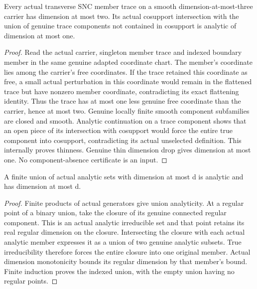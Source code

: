 \begin{lemma}
\label{hir:dimension-three-boundary-unselected-trace-dimone}
\leanok
Every actual transverse SNC member trace on a smooth dimension-at-most-three
carrier has dimension at most two. Its actual cosupport intersection with the
union of genuine trace components not contained in cosupport is analytic of
dimension at most one.
\end{lemma}
\begin{proof}
Read the actual carrier, singleton member trace and indexed boundary member in
the same genuine adapted coordinate chart. The member's coordinate lies among
the carrier's free coordinates. If the trace retained this coordinate as free,
a small actual perturbation in this coordinate would remain in the flattened
trace but have nonzero member coordinate, contradicting its exact flattening
identity. Thus the trace has at most one less genuine free coordinate than the
carrier, hence at most two. Genuine locally finite smooth component subfamilies
are closed and smooth. Analytic continuation on a trace component shows that
an open piece of its intersection with cosupport would force the entire true
component into cosupport, contradicting its actual unselected definition.
This internally proves thinness. Genuine thin dimension drop gives dimension
at most one. No component-absence certificate is an input.
\end{proof}

\begin{lemma}
\label{hir:dimension-three-actual-finite-analytic-union-dimone}
\leanok
A finite union of actual analytic sets with dimension at most d is analytic and
has dimension at most d.
\end{lemma}
\begin{proof}
Finite products of actual generators give union analyticity. At a regular point
of a binary union, take the closure of its genuine connected regular component.
This is an actual analytic irreducible set and that point retains its real
regular dimension on the closure. Intersecting the closure with each actual
analytic member expresses it as a union of two genuine analytic subsets. True
irreducibility therefore forces the entire closure into one original member.
Actual dimension monotonicity bounds its regular dimension by that member's
bound. Finite induction proves the indexed union, with the empty union having
no regular points.
\end{proof}

